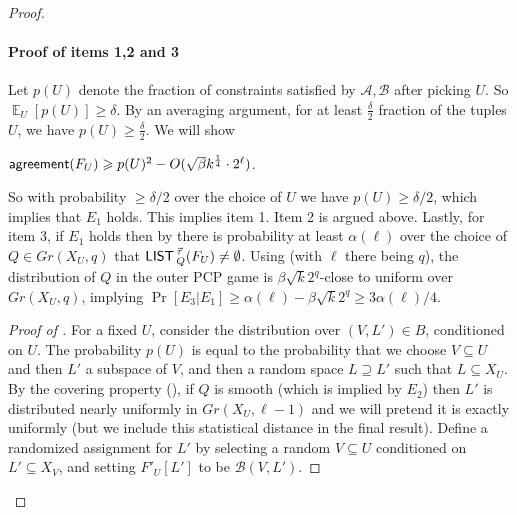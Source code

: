 \documentclass{toc}
\newcommand\Expect[2]{{\mathop{\mathbb{E}}_{#1}\left[ {#2} \right]}}
\renewcommand\geq{\geqslant}
\renewcommand\ge{\geqslant}
\renewcommand\subset{\subseteq}
\renewcommand\supset{\supseteq}
\def\M{{\sf LIST\,}}
\def\A{\mathcal{A}}
\def\B{\mathcal{B}}
\def\agr{{\sf agreement}}
\begin{document}
\begin{proof}
\paragraph{Proof of items 1,2 and 3}
Let $p(U)$ denote the fraction of constraints satisfied by $\A,\B$
after picking $U$.  So  $\Expect{U}{p(U)}\geq \delta$.  By an
averaging argument, for at least $\frac{\delta}{2}$ fraction of the
tuples $U$, we have $p(U) \geq \frac{\delta}{2}$.  We will show
\begin{claim}\label{claim:high-agr}
$\agr(F_U) \geq p(U)^2 - O(\sqrt{\beta} k^{\frac{1}{4}} \cdot 2^{\ell})$.
\end{claim}
So with probability $\ge\delta/2$ over the choice of $U$ we have $p(U)\ge\delta/2$,  which implies that  $E_1$ holds.
This implies item 1. Item 2 is argued above. %
Lastly, for item 3, if $E_1$ holds then by  there is probability at least $\alpha(\ell)$ over the choice of $Q\in Gr(X_U,q)$ that $\M^{\vec\tau}_Q(F_U)\neq\emptyset$.
Using  (with $\ell$ there being $q$), the distribution of $Q$ in the outer PCP game is $\beta\sqrt{k}2^{q}$-close to uniform over $Gr(X_U,q)$, implying
$\Pr{}[E_3|E_1]\geq \alpha(\ell)-\beta\sqrt{k}2^{q}\geq 3\alpha(\ell)/4$.
%
%

\begin{proof}[Proof of ]
For a fixed $U$, consider the distribution over $(V,L')\in B$, conditioned on $U$. The probability $p(U)$ is equal to the probability that we choose $V\subset U$ and then $L'$ a subspace of $V$, and then a random space $L\supset L'$ such that $L\subset X_U$.
By the covering property (), if $Q$ is smooth (which is implied by $E_2$) then $L'$ is distributed nearly uniformly in $Gr(X_U,\ell-1)$ and we will pretend it is exactly uniformly (but we include this statistical distance in the final result). Define a randomized assignment for $L'$ by selecting a random $V\subset U$ conditioned on $L' \subset X_V$, and setting $F'_U[L']$ to be $\B(V,L')$.


\end{proof}
\end{proof}
\end{document}
